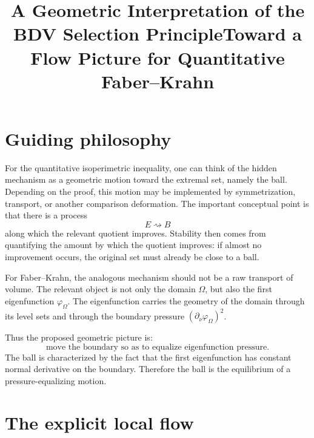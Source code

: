 \documentclass[11pt]{article}
\title{A Geometric Interpretation of the BDV Selection Principle\newline\large Toward a Flow Picture for Quantitative Faber--Krahn}
\author{}
\date{}
\newcommand{\Om}{\Omega}
\begin{document}
\maketitle

\section{Guiding philosophy}

For the quantitative isoperimetric inequality, one can think of the hidden mechanism as a geometric motion toward the extremal set, namely the ball. Depending on the proof, this motion may be implemented by symmetrization, transport, or another comparison deformation. The important conceptual point is that there is a process
\[
    E \rightsquigarrow B
\]
along which the relevant quotient improves. Stability then comes from quantifying the amount by which the quotient improves: if almost no improvement occurs, the original set must already be close to a ball.

For Faber--Krahn, the analogous mechanism should not be a raw transport of volume. The relevant object is not only the domain $\Om$, but also the first eigenfunction $\varphi_\Om$. The eigenfunction carries the geometry of the domain through its level sets and through the boundary pressure $(\partial_\nu \varphi_\Om)^2$.

Thus the proposed geometric picture is:
\[
    \text{move the boundary so as to equalize eigenfunction pressure.}
\]
The ball is characterized by the fact that the first eigenfunction has constant normal derivative on the boundary. Therefore the ball is the equilibrium of a pressure-equalizing motion.

\section{The explicit local flow}
\end{document}
